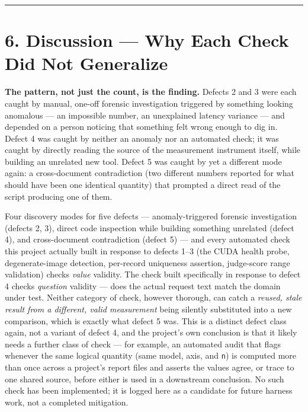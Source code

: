 \begin{center}\rule{0.5\linewidth}{0.5pt}\end{center}

\hypertarget{discussion-why-each-check-did-not-generalize}{%
\section{6. Discussion --- Why Each Check Did Not
Generalize}\label{discussion-why-each-check-did-not-generalize}}

\textbf{The pattern, not just the count, is the finding.} Defects 2 and
3 were each caught by manual, one-off forensic investigation triggered
by something looking anomalous --- an impossible number, an unexplained
latency variance --- and depended on a person noticing that something
felt wrong enough to dig in. Defect 4 was caught by neither an anomaly
nor an automated check; it was caught by directly reading the source of
the measurement instrument itself, while building an unrelated new tool.
Defect 5 was caught by yet a different mode again: a cross-document
contradiction (two different numbers reported for what should have been
one identical quantity) that prompted a direct read of the script
producing one of them.

Four discovery modes for five defects --- anomaly-triggered forensic
investigation (defects 2, 3), direct code inspection while building
something unrelated (defect 4), and cross-document contradiction (defect
5) --- and every automated check this project actually built in response
to defects 1--3 (the CUDA health probe, degenerate-image detection,
per-record uniqueness assertion, judge-score range validation) checks
\emph{value} validity. The check built specifically in response to
defect 4 checks \emph{question} validity --- does the actual request
text match the domain under test. Neither category of check, however
thorough, can catch a \emph{reused, stale result from a different, valid
measurement} being silently substituted into a new comparison, which is
exactly what defect 5 was. This is a distinct defect class again, not a
variant of defect 4, and the project's own conclusion is that it likely
needs a further class of check --- for example, an automated audit that
flags whenever the same logical quantity (same model, axis, and
\texttt{n}) is computed more than once across a project's report files
and asserts the values agree, or trace to one shared source, before
either is used in a downstream conclusion. No such check has been
implemented; it is logged here as a candidate for future harness work,
not a completed mitigation.


